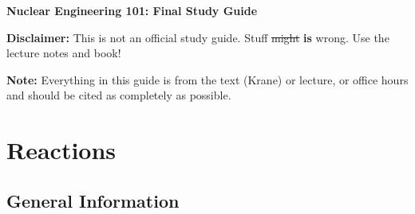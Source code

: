 \documentclass[letter]{article}
\begin{document}
\textbf{\Large{Nuclear Engineering 101: Final Study Guide}} \\
\vspace{12pt}

\textbf{Disclaimer:} This is not an official study guide. Stuff \sout{might}
\textbf{is} wrong. Use the lecture notes and book!
\vspace{10pt}

\textbf{Note:} Everything in this guide is from the text (Krane) or
lecture, or office hours and should be cited as completely as
possible.

\tableofcontents

\section{Reactions}

\subsection{General Information}
\end{document}
